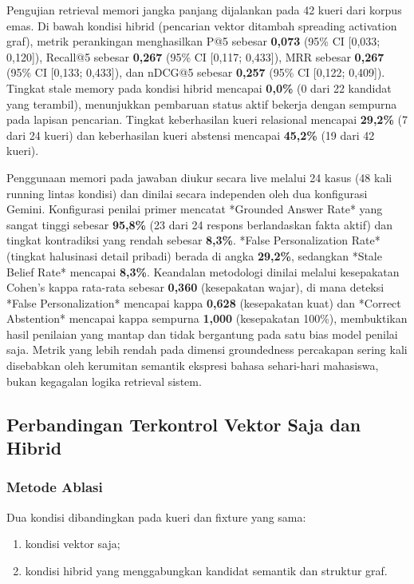 Pengujian retrieval memori jangka panjang dijalankan pada 42 kueri dari korpus emas. Di bawah kondisi hibrid (pencarian vektor ditambah spreading activation graf), metrik perankingan menghasilkan P@5 sebesar \textbf{0,073} (95\% CI [0,033; 0,120]), Recall@5 sebesar \textbf{0,267} (95\% CI [0,117; 0,433]), MRR sebesar \textbf{0,267} (95\% CI [0,133; 0,433]), dan nDCG@5 sebesar \textbf{0,257} (95\% CI [0,122; 0,409]). Tingkat stale memory pada kondisi hibrid mencapai \textbf{0,0\%} (0 dari 22 kandidat yang terambil), menunjukkan pembaruan status aktif bekerja dengan sempurna pada lapisan pencarian. Tingkat keberhasilan kueri relasional mencapai \textbf{29,2\%} (7 dari 24 kueri) dan keberhasilan kueri abstensi mencapai \textbf{45,2\%} (19 dari 42 kueri).

Penggunaan memori pada jawaban diukur secara live melalui 24 kasus (48 kali running lintas kondisi) dan dinilai secara independen oleh dua konfigurasi Gemini. Konfigurasi penilai primer mencatat *Grounded Answer Rate* yang sangat tinggi sebesar \textbf{95,8\%} (23 dari 24 respons berlandaskan fakta aktif) dan tingkat kontradiksi yang rendah sebesar \textbf{8,3\%}. *False Personalization Rate* (tingkat halusinasi detail pribadi) berada di angka \textbf{29,2\%}, sedangkan *Stale Belief Rate* mencapai \textbf{8,3\%}. Keandalan metodologi dinilai melalui kesepakatan Cohen's kappa rata-rata sebesar \textbf{0,360} (kesepakatan wajar), di mana deteksi *False Personalization* mencapai kappa \textbf{0,628} (kesepakatan kuat) dan *Correct Abstention* mencapai kappa sempurna \textbf{1,000} (kesepakatan 100\%), membuktikan hasil penilaian yang mantap dan tidak bergantung pada satu bias model penilai saja. Metrik yang lebih rendah pada dimensi groundedness percakapan sering kali disebabkan oleh kerumitan semantik ekspresi bahasa sehari-hari mahasiswa, bukan kegagalan logika retrieval sistem.

\subsection{Perbandingan Terkontrol Vektor Saja dan Hibrid}
\label{sec:v2-ablation}

\subsubsection{Metode Ablasi}

Dua kondisi dibandingkan pada kueri dan fixture yang sama:

\begin{enumerate}[label=\alph*.,leftmargin=*,itemsep=2pt]
  \item kondisi vektor saja;
  \item kondisi hibrid yang menggabungkan kandidat semantik dan struktur graf.
\end{enumerate}


